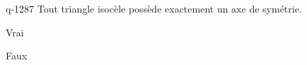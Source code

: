 \begin{truefalse}{q-1287}
Tout triangle isocèle possède exactement un axe de symétrie.
\item Vrai
\item* Faux
\end{truefalse}

